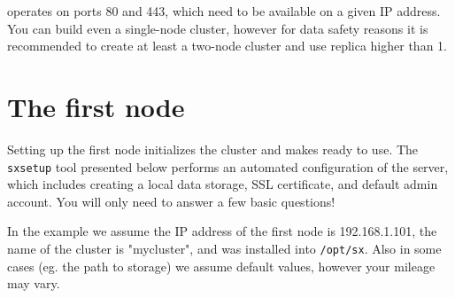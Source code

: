 \SX operates on ports 80 and 443, which need to be available on a given
IP address. You can build even a single-node \SX cluster, however for data
safety reasons it is recommended to create at least a two-node cluster and
use replica higher than 1.

\section*{The first node}

Setting up the first node initializes the cluster and makes \SX ready to
use. The \verb+sxsetup+ tool presented below performs an automated
configuration of the \SX server, which includes creating a local
data storage, SSL certificate, and default admin account. You will only
need to answer a few basic questions!

In the example we assume the IP address of the first node is
192.168.1.101, the name of the cluster is "mycluster", and \SX was
installed into \verb+/opt/sx+. Also in some cases (eg. the path to
\SX storage) we assume default values, however your mileage may vary.\\

